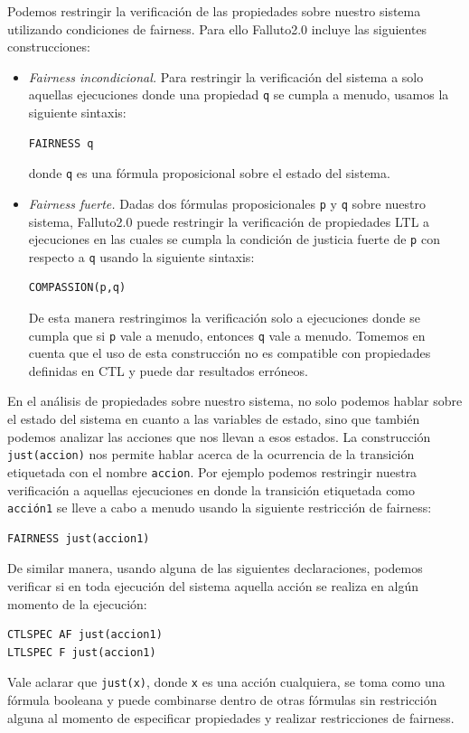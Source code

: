 \documentclass[pdftex,a4paper,12pt]{book}
\begin{document}
Podemos restringir la verificaci\'on de las propiedades sobre nuestro sistema utilizando condiciones de fairness. Para ello Falluto2.0 incluye las siguientes construcciones:
\begin{itemize}
\item \textit{Fairness incondicional.} Para restringir la verificaci\'on del sistema a solo aquellas ejecuciones donde una propiedad \texttt{q} se cumpla a menudo, usamos la siguiente sintaxis: \begin{verbatim}FAIRNESS q\end{verbatim} donde \texttt{q} es una f\'ormula proposicional sobre el estado del sistema.
\item \textit{Fairness fuerte.} Dadas dos f\'ormulas proposicionales \texttt{p} y \texttt{q} sobre nuestro sistema, Falluto2.0 puede restringir la verificaci\'on de propiedades LTL a ejecuciones en las cuales se cumpla la condici\'on de justicia fuerte de \texttt{p} con respecto a \texttt{q} usando la siguiente sintaxis: \begin{verbatim}COMPASSION(p,q)\end{verbatim} De esta manera restringimos la verificaci\'on solo a ejecuciones donde se cumpla que si \texttt{p} vale a menudo, entonces \texttt{q} vale a menudo. Tomemos en cuenta que el uso de esta construcci\'on no es compatible con propiedades definidas en CTL y puede dar resultados err\'oneos.
\end{itemize}

En el an\'alisis de propiedades sobre nuestro sistema, no solo podemos hablar sobre el estado del sistema en cuanto a las variables de estado, sino que tambi\'en podemos analizar las acciones que nos llevan a esos estados. La construcci\'on \texttt{just(accion)} nos permite hablar acerca de la ocurrencia de la transici\'on etiquetada con el nombre \texttt{accion}. Por ejemplo podemos restringir nuestra verificaci\'on a aquellas ejecuciones en donde la transici\'on etiquetada como \texttt{acci\'on1} se lleve a cabo a menudo usando la siguiente restricci\'on de fairness:
\begin{verbatim}
FAIRNESS just(accion1)
\end{verbatim}
De similar manera, usando alguna de las siguientes declaraciones, podemos verificar si en toda ejecuci\'on del sistema aquella acci\'on se realiza en alg\'un momento de la ejecuci\'on:
\begin{verbatim}
CTLSPEC AF just(accion1)
LTLSPEC F just(accion1)
\end{verbatim}
Vale aclarar que \texttt{just(x)}, donde \texttt{x} es una acci\'on cualquiera, se toma como una f\'ormula booleana y puede combinarse dentro de otras f\'ormulas sin restricci\'on alguna al momento de especificar propiedades y realizar restricciones de fairness.
\end{document}
